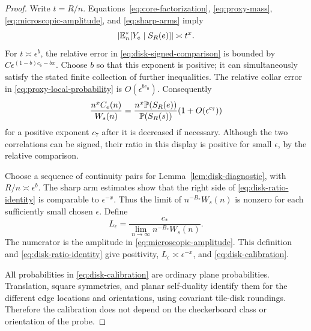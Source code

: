 \begin{proof}
Write $t=R/n$. Equations~\eqref{eq:core-factorization},
\eqref{eq:proxy-mass}, \eqref{eq:microscopic-amplitude}, and
\eqref{eq:sharp-arms} imply
\begin{equation}\label{eq:edge-expectation-size}
 \left|\mathbb E_n^*[Y_e\mid S_R(e)]\right|\asymp t^x.
\end{equation}
For $t\asymp\epsilon^b$, the relative error in
\eqref{eq:disk-signed-comparison} is bounded by
$C\epsilon^{(1-b)c_6-bx}$. Choose $b$ so that this exponent is
positive; it can simultaneously satisfy the stated finite collection
of further inequalities. The relative collar error in
\eqref{eq:proxy-local-probability} is $O(\epsilon^{bc_0})$.
Consequently
\begin{equation}\label{eq:disk-ratio-identity}
 \frac{n^x C_e(n)}{W_s(n)}
 =\frac{n^x\mathbb P(S_R(e))}{\mathbb P(S_R(s))}
                    (1+O(\epsilon^{c_7}))
\end{equation}
for a positive exponent $c_7$ after it is decreased if necessary.
Although the two correlations can be signed, their ratio in this
display is positive for small $\epsilon$, by the relative comparison.

Choose a sequence of continuity pairs for
Lemma~\ref{lem:disk-diagnostic}, with
$R/n\asymp\epsilon^b$. The sharp arm estimates show that the right
side of \eqref{eq:disk-ratio-identity} is comparable to
$\epsilon^{-x}$. Thus the limit of $n^{-B_*}W_s(n)$ is nonzero for
each sufficiently small chosen $\epsilon$. Define
\[
 L_\epsilon=
 \frac{c_*}{\displaystyle\lim_{n\to\infty}n^{-B_*}W_s(n)}.
\]
The numerator is the amplitude in
\eqref{eq:microscopic-amplitude}. This definition and
\eqref{eq:disk-ratio-identity} give positivity,
$L_\epsilon\asymp\epsilon^{-x}$, and
\eqref{eq:disk-calibration}.

All probabilities in \eqref{eq:disk-calibration} are ordinary plane
probabilities. Translation, square symmetries, and planar self-duality
identify them for the different edge locations and orientations, using
covariant tile-disk roundings. Therefore the calibration does not
depend on the checkerboard class or orientation of the probe.
\end{proof}
